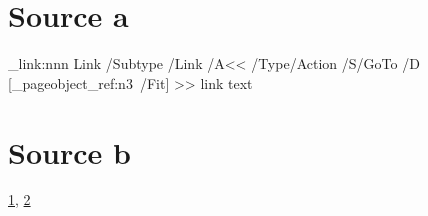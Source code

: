 \documentclass{article}
\begin{document}
\section{Source a}\label{a}

\newpage 
\ExplSyntaxOn
\pdfannot_link:nnn { Link }
{
 /Subtype /Link
/A<<
/Type/Action
/S/GoTo
/D [\pdf_pageobject_ref:n{3}~/Fit]
>>
}
{ link text}
\ExplSyntaxOff
{}
\newpage 
\section{Source b}\label{b}

\ref{a}, \ref{b} 
\end{document}
